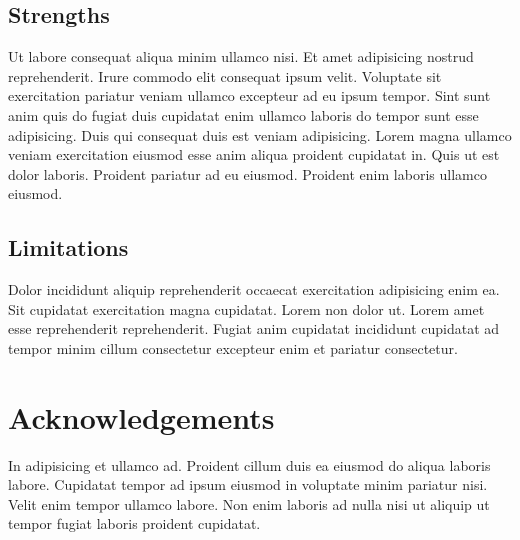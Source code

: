 \documentclass[
  super,
  preprint,
  3p]{elsarticle}
\newlength{\cslhangindent}
\newlength{\cslentryspacingunit} %
\newenvironment{CSLReferences}[2] %
 {%
  \setlength{\parindent}{0pt}
  \ifodd #1
  \let\oldpar\par
  \def\par{\hangindent=\cslhangindent\oldpar}
  \fi
  \setlength{\parskip}{#2\cslentryspacingunit}
 }%
 {}
\begin{document}
\hypertarget{strengths}{%
\subsection{Strengths}\label{strengths}}

Ut labore consequat aliqua minim ullamco nisi. Et amet adipisicing
nostrud reprehenderit. Irure commodo elit consequat ipsum velit.
Voluptate sit exercitation pariatur veniam ullamco excepteur ad eu ipsum
tempor. Sint sunt anim quis do fugiat duis cupidatat enim ullamco
laboris do tempor sunt esse adipisicing. Duis qui consequat duis est
veniam adipisicing. Lorem magna ullamco veniam exercitation eiusmod esse
anim aliqua proident cupidatat in. Quis ut est dolor laboris. Proident
pariatur ad eu eiusmod. Proident enim laboris ullamco eiusmod.

\hypertarget{limitations}{%
\subsection{Limitations}\label{limitations}}

Dolor incididunt aliquip reprehenderit occaecat exercitation adipisicing
enim ea. Sit cupidatat exercitation magna cupidatat. Lorem non dolor ut.
Lorem amet esse reprehenderit reprehenderit. Fugiat anim cupidatat
incididunt cupidatat ad tempor minim cillum consectetur excepteur enim
et pariatur consectetur.

\hypertarget{acknowledgements}{%
\section{Acknowledgements}\label{acknowledgements}}

In adipisicing et ullamco ad. Proident cillum duis ea eiusmod do aliqua
laboris labore. Cupidatat tempor ad ipsum eiusmod in voluptate minim
pariatur nisi. Velit enim tempor ullamco labore. Non enim laboris ad
nulla nisi ut aliquip ut tempor fugiat laboris proident cupidatat.

\newpage{}

\hypertarget{refs}{}
\begin{CSLReferences}{0}{0}
\end{CSLReferences}

\newpage

\hypertarget{refs}{}
\begin{CSLReferences}{0}{0}
\end{CSLReferences}

\newpage{}
\end{document}
